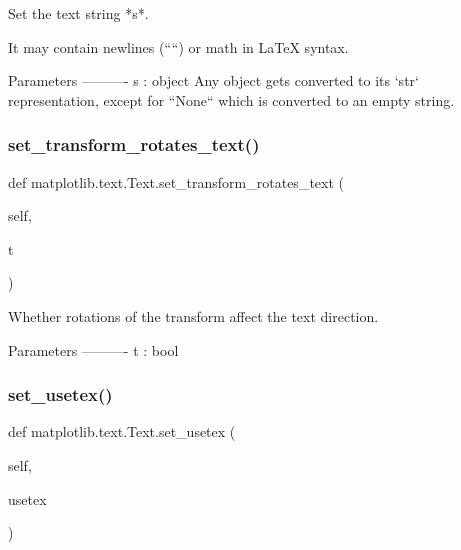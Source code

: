 \begin{DoxyVerb}Set the text string *s*.

It may contain newlines (``\n``) or math in LaTeX syntax.

Parameters
----------
s : object
    Any object gets converted to its `str` representation, except for
    ``None`` which is converted to an empty string.
\end{DoxyVerb}
 \mbox{\label{classmatplotlib_1_1text_1_1Text_ae4a470f970808306a348a48718b15d8c}} 
\subsubsection{\texorpdfstring{set\+\_\+transform\+\_\+rotates\+\_\+text()}{set\_transform\_rotates\_text()}}
{\footnotesize\ttfamily def matplotlib.\+text.\+Text.\+set\+\_\+transform\+\_\+rotates\+\_\+text (\begin{DoxyParamCaption}\item[{}]{self,  }\item[{}]{t }\end{DoxyParamCaption})}

\begin{DoxyVerb}Whether rotations of the transform affect the text direction.

Parameters
----------
t : bool
\end{DoxyVerb}
 \mbox{\label{classmatplotlib_1_1text_1_1Text_a314a3c01352599f5644310a4be4563d8}} 
\subsubsection{\texorpdfstring{set\+\_\+usetex()}{set\_usetex()}}
{\footnotesize\ttfamily def matplotlib.\+text.\+Text.\+set\+\_\+usetex (\begin{DoxyParamCaption}\item[{}]{self,  }\item[{}]{usetex }\end{DoxyParamCaption})}

